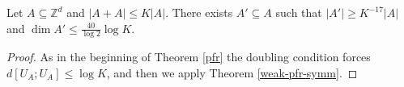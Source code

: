 \begin{theorem}\label{weak-pfr-int}\leanok
Let $A\subseteq \mathbb{Z}^d$ and $\lvert A+A\rvert\leq K\lvert A\rvert$.
There exists $A'\subseteq A$ such that $\lvert A'\rvert \geq K^{-17}\lvert
A\rvert$ and $\dim A' \leq \frac{40}{\log 2}\log K$.
\end{theorem}
\begin{proof}\leanok
{}
As in the beginning of Theorem \ref{pfr} the doubling condition forces $d[U_A;U_A]\leq \log K$, and then we apply Theorem \ref{weak-pfr-symm}.
\end{proof}
